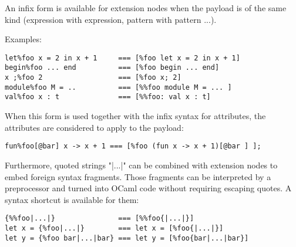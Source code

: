 An infix form is available for extension nodes when
the payload is of the same kind
(expression with expression, pattern with pattern ...).

Examples:

\begin{verbatim}
let%foo x = 2 in x + 1     === [%foo let x = 2 in x + 1]
begin%foo ... end          === [%foo begin ... end]
x ;%foo 2                  === [%foo x; 2]
module%foo M = ..          === [%%foo module M = ... ]
val%foo x : t              === [%%foo: val x : t]
\end{verbatim}

When this form is used together with the infix syntax for attributes,
the attributes are considered to apply to the payload:

\begin{verbatim}
fun%foo[@bar] x -> x + 1 === [%foo (fun x -> x + 1)[@bar ] ];
\end{verbatim}

Furthermore, quoted strings "{|...|}" can be combined with extension nodes
to embed foreign syntax fragments. Those fragments can be interpreted
by a preprocessor and turned into OCaml code without requiring escaping
quotes. A syntax shortcut is available for them:

\begin{verbatim}
{%%foo|...|}               === [%%foo{|...|}]
let x = {%foo|...|}        === let x = [%foo{|...|}]
let y = {%foo bar|...|bar} === let y = [%foo{bar|...|bar}]
\end{verbatim}

